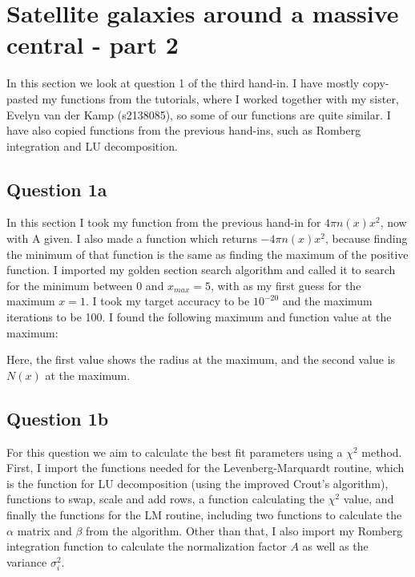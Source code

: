 \section{Satellite galaxies around a massive central - part 2}

In this section we look at question 1 of the third hand-in. 
I have mostly copy-pasted my functions from the tutorials, where I worked together with my sister,
Evelyn van der Kamp (s2138085), so some of our functions are quite similar.
I have also copied functions from the previous hand-ins, such as Romberg integration and LU decomposition.



\subsection{Question 1a}

In this section I took my function from the previous hand-in for $4 \pi n(x) x^2$, now with A given.
I also made a function which returns $-4 \pi n(x) x^2$, because finding the minimum of that function is the same as finding the maximum of the positive function.
I imported my golden section search algorithm and called it to search for the minimum between 0 and $x_{max} = 5$, with as my first guess for the maximum $x=1$.
I took my target accuracy to be $10^{-20}$ and the maximum iterations to be 100.
I found the following maximum and function value at the maximum:



Here, the first value shows the radius at the maximum, and the second value is $N(x)$ at the maximum.


\subsection{Question 1b}

For this question we aim to calculate the best fit parameters using a $\chi^2$ method. 
First, I import the functions needed for the Levenberg-Marquardt routine, which is the function for LU decomposition (using the improved Crout's algorithm), functions to swap, scale and add rows, a function calculating the $\chi^2$ value, and finally the functions for the LM routine, including two functions to calculate the $\alpha$ matrix and $\beta$ from the algorithm.
Other than that, I also import my Romberg integration function to calculate the normalization factor $A$ as well as the variance $\sigma_i^2$.

